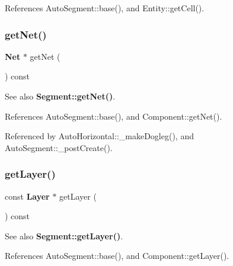 References Auto\+Segment\+::base(), and Entity\+::get\+Cell().

\mbox{\label{classKatabatic_1_1AutoSegment_a692492374623a5c6096b2c4a51190359}} 
\subsubsection{\texorpdfstring{get\+Net()}{getNet()}}
{\footnotesize\ttfamily \textbf{ Net} $\ast$ get\+Net (\begin{DoxyParamCaption}{ }\end{DoxyParamCaption}) const\hspace{0.3cm}{\ttfamily [inline]}}

\begin{DoxySeeAlso}{See also}
\textbf{ Segment\+::get\+Net()}. 
\end{DoxySeeAlso}


References Auto\+Segment\+::base(), and Component\+::get\+Net().



Referenced by Auto\+Horizontal\+::\+\_\+make\+Dogleg(), and Auto\+Segment\+::\+\_\+post\+Create().

\mbox{\label{classKatabatic_1_1AutoSegment_ab045567c4f529dca7790d66c17c3084f}} 
\subsubsection{\texorpdfstring{get\+Layer()}{getLayer()}}
{\footnotesize\ttfamily const \textbf{ Layer} $\ast$ get\+Layer (\begin{DoxyParamCaption}{ }\end{DoxyParamCaption}) const\hspace{0.3cm}{\ttfamily [inline]}}

\begin{DoxySeeAlso}{See also}
\textbf{ Segment\+::get\+Layer()}. 
\end{DoxySeeAlso}


References Auto\+Segment\+::base(), and Component\+::get\+Layer().




